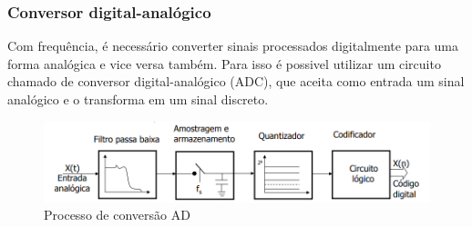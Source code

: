 \subsubsection{Conversor digital-analógico}

Com frequência, é necessário converter sinais processados digitalmente para uma forma analógica e vice versa também. Para isso é possivel utilizar um circuito chamado de conversor digital-analógico (ADC), que aceita como entrada um sinal analógico e o transforma em um sinal discreto.

\begin{figure}[!htbp]
    \caption{Processo de conversão AD} \label{ad_da}
    \includegraphics[scale=0.5]{images/AD-DA_adaptado.png}
\end{figure}

